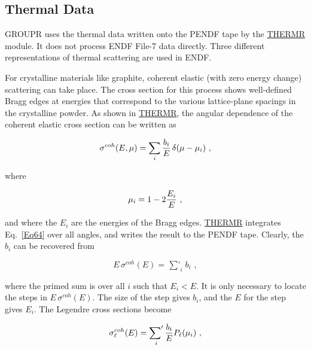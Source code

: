 \subsection{Thermal Data}
\label{ssGROUPR_Thermal}

GROUPR uses the thermal data written onto the PENDF tape
by the \hyperlink{sTHERMRhy}{THERMR} module.  It
does not process ENDF File-7
data directly.  Three different representations of thermal scattering
are used in ENDF.

For crystalline materials like graphite, coherent elastic (with zero
energy change) scattering can take place.  The
cross section for this process shows well-defined Bragg
edges at energies that correspond to the
various lattice-plane spacings in the crystalline powder.  As shown
in \hyperlink{sTHERMRhy}{THERMR}, the angular dependence of the
coherent elastic cross section can be written as

  \begin{equation}
    \sigma^{coh}(E,\mu)=\sum_i {{b_i} \over {E}}
    \,\delta(\mu-\mu_i)\,\,,
  \label{Eq64}
  \end{equation}

\noindent
where

  \begin{equation}
    \mu_i=1-2{{E_i} \over {E}}\,\,,
  \end{equation}

\noindent
and where the $E_i$ are the energies of the Bragg
edges.  \hyperlink{sTHERMRhy}{THERMR}
integrates Eq.~\ref{Eq64} over all angles, and writes the result
to the PENDF tape.  Clearly, the $b_i$ can be recovered from

  \begin{equation}
    E\,\sigma^{coh}(E)=\mathop{{\sum}'}_i b_i\,\,,
  \label{Eq66}
  \end{equation}
\vspace{1 pt}

\noindent
where the primed sum is over all $i$ such that $E_i <E$.  It is only
necessary to locate the steps in $E\,\sigma^{coh}(E)$.  The size of the
step gives $b_i$, and the $E$ for the step gives $E_i$.  The Legendre
cross sections become

  \begin{equation}
    \sigma^{coh}_\ell (E)=\mathop{{\sum}'}_i {{b_i} \over {E}}
     P_\ell (\mu_i)\,\,,
  \label{Eq67}
  \end{equation}

